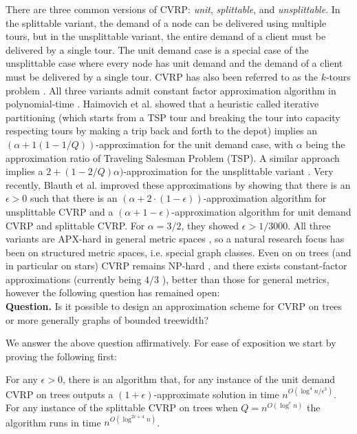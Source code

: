 \documentclass[twoside,leqno]{article}
\newcommand{\eps}{\epsilon}
\begin{document}
There are three common versions of CVRP: \emph{unit}, \emph{splittable}, and \emph{unsplittable}. In the splittable variant, the demand of a node can be delivered using multiple tours, but in the unsplittable variant, the entire demand of a client must be delivered by a single tour. The unit demand case is a special case of the unsplittable case where every node has unit demand and the demand of a client must be delivered by a single tour. CVRP has also been referred to as the $k$-tours problem \cite{Arora-Euclidean-PTAS, stoc/AsanoKTT97}.
 All three variants admit constant factor approximation algorithm in polynomial-time \cite{Haimovich-Kan}. Haimovich et al. \cite{Haimovich-Kan} showed that a heuristic
 called iterative partitioning (which starts from a TSP tour and breaking the tour into capacity respecting tours by making a trip back and  forth to the depot) implies an $(\alpha+1(1-1/Q))$-approximation
 for the unit demand case, with $\alpha$ being the approximation ratio of Traveling Salesman Problem (TSP). 
 A similar approach implies a
$2 + (1 - 2/Q)\alpha)$-approximation for the unsplittable variant \cite{ALTINKEMER1987149}. Very recently, Blauth et al. \cite{Vygen} improved these approximations by showing that there is an $\eps > 0$ such that there is an $(\alpha + 2 \cdot (1 - \eps))$-approximation algorithm for unsplittable CVRP and a $(\alpha + 1 - \eps)$-approximation algorithm for unit demand CVRP and splittable CVRP. For $\alpha = 3/2$, they showed $\eps > 1/3000$. 
 All three variants are APX-hard in general metric spaces \cite{Papadimitrio-Yannakakis}, so a natural research focus has been on structured metric spaces, i.e. special graph classes. Even on on trees (and in particular on stars) CVRP remains NP-hard \cite{Labbe-Mercure}, and there exists constant-factor approximations (currently being $4/3$ \cite{Becker18}), better than those for general metrics, however the following question has remained open:\\
\textbf{Question.} Is it possible to design an approximation scheme for CVRP on trees or more generally graphs of bounded treewidth? 


We answer the above question affirmatively. For ease of exposition we start by proving the following first:
\begin{theorem}\label{thm:tree}
For any $\eps > 0$, there is an algorithm that, for any instance of the unit demand CVRP on trees outputs a $(1 + \eps)$-approximate solution in time $n^{O(\log^4 n/\eps^3)}$.
For any instance of the splittable CVRP on trees when $Q = n^{O(\log^c n)}$ the algorithm  
runs in time $n^{O(\log^{2c + 4}n)}$.
\end{theorem}
\end{document}
